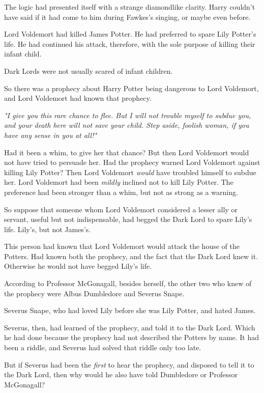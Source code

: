 The logic had presented itself with a strange diamondlike clarity. Harry 
couldn't have said if it had come to him during Fawkes's singing, or maybe even 
before.

Lord Voldemort had killed James Potter. He had preferred to spare Lily Potter's 
life. He had continued his attack, therefore, with the sole purpose of killing 
their infant child.

Dark Lords were not usually scared of infant children.

So there was a prophecy about Harry Potter being dangerous to Lord Voldemort, 
and Lord Voldemort had known that prophecy.

\emph{"I give you this rare chance to flee. But I will not trouble myself to 
subdue you, and your death here will not save your child. Step aside, foolish 
woman, if you have any sense in you at all!"}

Had it been a whim, to give her that chance? But then Lord Voldemort would not 
have tried to persuade her. Had the prophecy warned Lord Voldemort against 
killing Lily Potter? Then Lord Voldemort \emph{would} have troubled himself to 
subdue her. Lord Voldemort had been \emph{mildly} inclined not to kill Lily 
Potter. The preference had been stronger than a whim, but not as strong as a 
warning.

So suppose that someone whom Lord Voldemort considered a lesser ally or 
servant, useful but not indispensable, had begged the Dark Lord to spare Lily's 
life. Lily's, but not James's.

This person had known that Lord Voldemort would attack the house of the 
Potters. Had known both the prophecy, and the fact that the Dark Lord knew it. 
Otherwise he would not have begged Lily's life.

According to Professor McGonagall, besides herself, the other two who knew of 
the prophecy were Albus Dumbledore and Severus Snape.

Severus Snape, who had loved Lily before she was Lily Potter, and hated James.

Severus, then, had learned of the prophecy, and told it to the Dark Lord. Which 
he had done because the prophecy had not described the Potters by name. It had 
been a riddle, and Severus had solved that riddle only too late.

But if Severus had been the \emph{first} to hear the prophecy, and disposed to 
tell it to the Dark Lord, then why would he also have told Dumbledore or 
Professor McGonagall?

